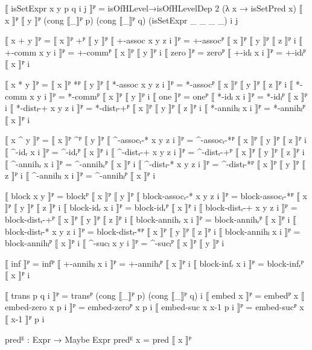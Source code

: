\begin{code}[hide]
  ⟦ isSetExpr x y p q i j ⟧ᴾ =
    isOfHLevel→isOfHLevelDep 2 (λ x → isSetPred x)
      ⟦ x ⟧ᴾ ⟦ y ⟧ᴾ (cong ⟦_⟧ᴾ p) (cong ⟦_⟧ᴾ q) (isSetExpr _ _ _ _) i j

  ⟦ x + y ⟧ᴾ = ⟦ x ⟧ᴾ +ᴾ ⟦ y ⟧ᴾ
  ⟦ +-assoc x y z i ⟧ᴾ = +-assocᴾ ⟦ x ⟧ᴾ ⟦ y ⟧ᴾ ⟦ z ⟧ᴾ i
  ⟦ +-comm x y i ⟧ᴾ = +-commᴾ ⟦ x ⟧ᴾ ⟦ y ⟧ᴾ i
  ⟦ zero ⟧ᴾ = zeroᴾ
  ⟦ +-idₗ x i ⟧ᴾ = +-idₗᴾ ⟦ x ⟧ᴾ i

  ⟦ x * y ⟧ᴾ = ⟦ x ⟧ᴾ *ᴾ ⟦ y ⟧ᴾ
  ⟦ *-assoc x y z i ⟧ᴾ = *-assocᴾ ⟦ x ⟧ᴾ ⟦ y ⟧ᴾ ⟦ z ⟧ᴾ i
  ⟦ *-comm x y i ⟧ᴾ = *-commᴾ ⟦ x ⟧ᴾ ⟦ y ⟧ᴾ i
  ⟦ one ⟧ᴾ = oneᴾ
  ⟦ *-idₗ x i ⟧ᴾ = *-idₗᴾ ⟦ x ⟧ᴾ i
  ⟦ *-distₗ-+ x y z i ⟧ᴾ = *-distₗ-+ᴾ ⟦ x ⟧ᴾ ⟦ y ⟧ᴾ ⟦ z ⟧ᴾ i
  ⟦ *-annihₗ x i ⟧ᴾ = *-annihₗᴾ ⟦ x ⟧ᴾ i

  ⟦ x ^ y ⟧ᴾ = ⟦ x ⟧ᴾ ^ᴾ ⟦ y ⟧ᴾ
  ⟦ ^-assocᵣ-* x y z i ⟧ᴾ = ^-assocᵣ-*ᴾ ⟦ x ⟧ᴾ ⟦ y ⟧ᴾ ⟦ z ⟧ᴾ i
  ⟦ ^-idᵣ x i ⟧ᴾ = ^-idᵣᴾ ⟦ x ⟧ᴾ i
  ⟦ ^-distᵣ-+ x y z i ⟧ᴾ = ^-distᵣ-+ᴾ ⟦ x ⟧ᴾ ⟦ y ⟧ᴾ ⟦ z ⟧ᴾ i
  ⟦ ^-annihᵣ x i ⟧ᴾ = ^-annihᵣᴾ ⟦ x ⟧ᴾ i
  ⟦ ^-distₗ-* x y z i ⟧ᴾ = ^-distₗ-*ᴾ ⟦ x ⟧ᴾ ⟦ y ⟧ᴾ ⟦ z ⟧ᴾ i
  ⟦ ^-annihₗ x i ⟧ᴾ = ^-annihₗᴾ ⟦ x ⟧ᴾ i

  ⟦ block x y ⟧ᴾ = blockᴾ ⟦ x ⟧ᴾ ⟦ y ⟧ᴾ
  ⟦ block-assocᵣ-* x y z i ⟧ᴾ = block-assocᵣ-*ᴾ ⟦ x ⟧ᴾ ⟦ y ⟧ᴾ ⟦ z ⟧ᴾ i
  ⟦ block-idᵣ x i ⟧ᴾ = block-idᵣᴾ ⟦ x ⟧ᴾ i
  ⟦ block-distᵣ-+ x y z i ⟧ᴾ = block-distᵣ-+ᴾ ⟦ x ⟧ᴾ ⟦ y ⟧ᴾ ⟦ z ⟧ᴾ i
  ⟦ block-annihᵣ x i ⟧ᴾ = block-annihᵣᴾ ⟦ x ⟧ᴾ i
  ⟦ block-distₗ-* x y z i ⟧ᴾ = block-distₗ-*ᴾ ⟦ x ⟧ᴾ ⟦ y ⟧ᴾ ⟦ z ⟧ᴾ i
  ⟦ block-annihₗ x i ⟧ᴾ = block-annihₗᴾ ⟦ x ⟧ᴾ i
  ⟦ ^-sucₗ x y i ⟧ᴾ = ^-sucₗᴾ ⟦ x ⟧ᴾ ⟦ y ⟧ᴾ i

  ⟦ inf ⟧ᴾ = infᴾ
  ⟦ +-annihₗ x i ⟧ᴾ = +-annihₗᴾ ⟦ x ⟧ᴾ i
  ⟦ block-infᵣ x i ⟧ᴾ = block-infᵣᴾ ⟦ x ⟧ᴾ i

  ⟦ trans p q i ⟧ᴾ = transᴾ (cong ⟦_⟧ᴾ p) (cong ⟦_⟧ᴾ q) i
  ⟦ embed x ⟧ᴾ = embedᴾ x
  ⟦ embed-zero x p i ⟧ᴾ = embed-zeroᴾ x p i
  ⟦ embed-suc x x-1 p i ⟧ᴾ = embed-sucᴾ x ⟦ x-1 ⟧ᴾ p i
\end{code}
\begin{code}
  predᴱ : Expr → Maybe Expr
  predᴱ x = pred ⟦ x ⟧ᴾ
\end{code}
